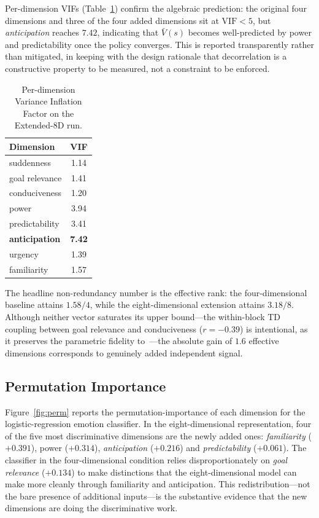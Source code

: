 \documentclass[conference]{IEEEtran}
\begin{document}
Per-dimension VIFs (Table~\ref{tab:vif}) confirm the algebraic prediction:
the original four dimensions and three of the four added dimensions sit at
$\mathrm{VIF} < 5$, but \emph{anticipation} reaches $7.42$, indicating that
$\bar V(s)$ becomes well-predicted by power and predictability once the
policy converges. This is reported transparently rather than mitigated, in
keeping with the design rationale that decorrelation is a constructive
property to be measured, not a constraint to be enforced.

\begin{table}[!t]
\centering
\small
\setlength{\tabcolsep}{6pt}
\renewcommand{\arraystretch}{1.1}
\caption{Per-dimension Variance Inflation Factor on the Extended-8D run.}
\label{tab:vif}
\begin{tabular}{lc}
\toprule
Dimension & VIF \\
\midrule
suddenness        & 1.14 \\
goal relevance    & 1.41 \\
conduciveness     & 1.20 \\
power             & 3.94 \\
predictability    & 3.41 \\
\textbf{anticipation}  & \textbf{7.42} \\
urgency           & 1.39 \\
familiarity       & 1.57 \\
\bottomrule
\end{tabular}
\end{table}

The headline non-redundancy number is the effective rank: the
four-dimensional baseline attains $1.58/4$, while the eight-dimensional
extension attains $3.18/8$. Although neither vector saturates its
upper bound---the within-block TD coupling between goal relevance and
conduciveness ($r = -0.39$) is intentional, as it preserves the parametric
fidelity to~\cite{zhang2023modeling}---the absolute gain of $1.6$ effective
dimensions corresponds to genuinely added independent signal.

\subsection{Permutation Importance}
Figure~\ref{fig:perm} reports the permutation-importance of each dimension
for the logistic-regression emotion classifier. In the eight-dimensional
representation, four of the five most discriminative dimensions are the
newly added ones: \emph{familiarity} ($+0.391$), power ($+0.314$),
\emph{anticipation} ($+0.216$) and \emph{predictability} ($+0.061$). The
classifier in the four-dimensional condition relies disproportionately on
\emph{goal relevance} ($+0.134$) to make distinctions that the
eight-dimensional model can make more cleanly through familiarity and
anticipation. This redistribution---not the bare presence of additional
inputs---is the substantive evidence that the new dimensions are doing the
discriminative work.
\end{document}
